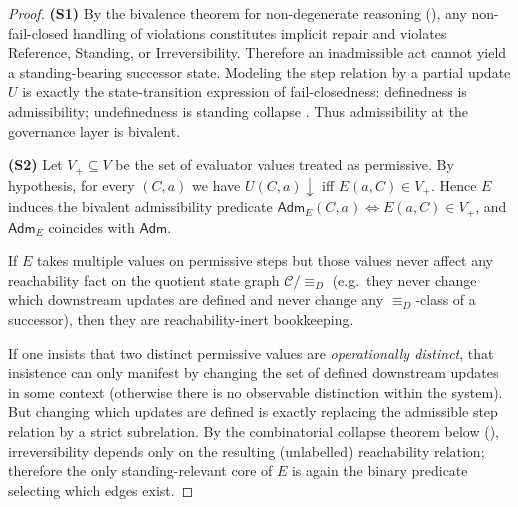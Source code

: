 \documentclass[11pt]{article}
\theoremstyle{definition}
\newcommand{\Adm}{\mathsf{Adm}}
\begin{document}
\begin{proof}
\textbf{(S1)} By the bivalence theorem for non-degenerate reasoning (),
any non-fail-closed handling of violations constitutes implicit repair and violates Reference, Standing, or Irreversibility.
Therefore an inadmissible act cannot yield a standing-bearing successor state.
Modeling the step relation by a partial update $U$ is exactly the state-transition expression of fail-closedness:
definedness is admissibility; undefinedness is standing collapse \cite{MaleyStandingCollapseIdentity2026}.
Thus admissibility at the governance layer is bivalent.

\textbf{(S2)} Let $V_+\subseteq V$ be the set of evaluator values treated as permissive.
By hypothesis, for every $(C,a)$ we have $U(C,a)\downarrow$ iff $E(a,C)\in V_+$.
Hence $E$ induces the bivalent admissibility predicate $\Adm_E(C,a)\iff E(a,C)\in V_+$, and $\Adm_E$ coincides with $\Adm$.

If $E$ takes multiple values on permissive steps but those values never affect any reachability fact on the quotient state graph
$\mathcal{C}/\equiv_D$ (e.g.\ they never change which downstream updates are defined and never change any $\equiv_D$-class of a
successor), then they are reachability-inert bookkeeping.

If one insists that two distinct permissive values are \emph{operationally distinct}, that insistence can only manifest by
changing the set of defined downstream updates in some context (otherwise there is no observable distinction within the system).
But changing which updates are defined is exactly replacing the admissible step relation by a strict subrelation.
By the combinatorial collapse theorem below (), irreversibility depends only on the resulting
(unlabelled) reachability relation; therefore the only standing-relevant core of $E$ is again the binary predicate selecting
which edges exist.
\end{proof}
\end{document}
